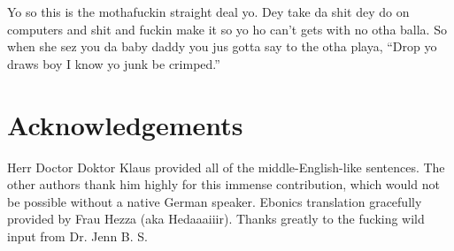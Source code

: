 \documentclass[preprint,10pt]{sigplanconf}
\begin{document}
Yo so this is the mothafuckin straight deal yo. Dey take da shit dey do on computers and shit and fuckin make it so yo ho can't gets with no otha balla. So when she sez you da baby daddy you jus gotta say to the otha playa, ``Drop yo draws boy I know yo junk be crimped.''

\section{Acknowledgements}
Herr Doctor Doktor Klaus provided all of the middle-English-like sentences. The other authors thank him highly for this immense contribution, which would not be possible without a native German speaker. Ebonics translation gracefully provided by Frau Hezza (aka Hedaaaiiir). Thanks greatly to the fucking wild input from Dr. Jenn B. S.
\end{document}
